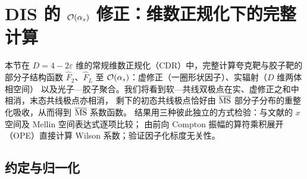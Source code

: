 \section{DIS 的 \texorpdfstring{$\mathcal{O}\!\left(\alpha_s\right)$}{O(alpha_s)} 修正：维数正规化下的完整计算}
\label{sec:dis1l}

本节在 $D=4-2\varepsilon$ 维的常规维数正规化（CDR）中，完整计算夸克靶与胶子靶的部分子结构函数
$\hat F_2$、$\hat F_L$ 至 $\mathcal{O}\!\left(\alpha_s\right)$：虚修正（一圈形状因子）、实辐射（$D$ 维两体相空间）
以及光子—胶子聚合。我们将看到软—共线双极点在实、虚修正之和中相消，末态共线极点亦相消，
剩下的初态共线极点恰好由 $\overline{\mathrm{MS}}$ 部分子分布的重整化吸收，从而得到 $\overline{\mathrm{MS}}$ 系数函数。
结果用三种彼此独立的方式检验：与文献的 $x$ 空间及 Mellin 空间表达式逐项比较；
由前向 Compton 振幅的算符乘积展开（OPE）直接计算 Wilson 系数；验证因子化标度无关性。

\subsection{约定与归一化}

